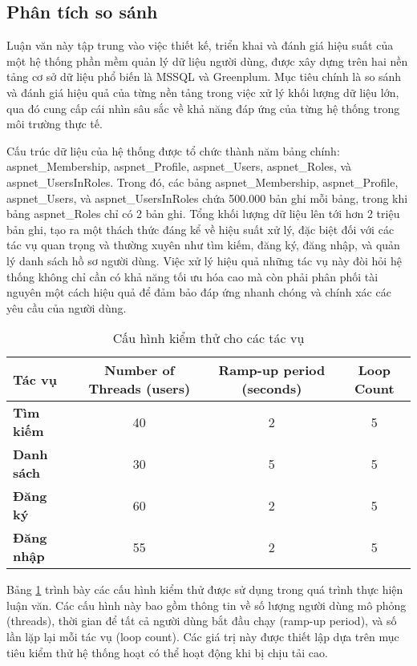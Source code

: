 \subsection{Phân tích so sánh}

Luận văn này tập trung vào việc thiết kế, triển khai và đánh giá hiệu suất của một hệ thống phần mềm quản lý dữ liệu người dùng, được xây dựng trên hai nền tảng cơ sở dữ liệu phổ biến là MSSQL và Greenplum. Mục tiêu chính là so sánh và đánh giá hiệu quả của từng nền tảng trong việc xử lý khối lượng dữ liệu lớn, qua đó cung cấp cái nhìn sâu sắc về khả năng đáp ứng của từng hệ thống trong môi trường thực tế.

Cấu trúc dữ liệu của hệ thống được tổ chức thành năm bảng chính: aspnet\_Membership, aspnet\_Profile, aspnet\_Users, aspnet\_Roles, và aspnet\_UsersInRoles. Trong đó, các bảng aspnet\_Membership, aspnet\_Profile, aspnet\_Users, và aspnet\_UsersInRoles chứa 500.000 bản ghi mỗi bảng, trong khi bảng aspnet\_Roles chỉ có 2 bản ghi. Tổng khối lượng dữ liệu lên tới hơn 2 triệu bản ghi, tạo ra một thách thức đáng kể về hiệu suất xử lý, đặc biệt đối với các tác vụ quan trọng và thường xuyên như tìm kiếm, đăng ký, đăng nhập, và quản lý danh sách hồ sơ người dùng. Việc xử lý hiệu quả những tác vụ này đòi hỏi hệ thống không chỉ cần có khả năng tối ưu hóa cao mà còn phải phân phối tài nguyên một cách hiệu quả để đảm bảo đáp ứng nhanh chóng và chính xác các yêu cầu của người dùng.

\begin{table}[htbp]
\centering
\renewcommand{\arraystretch}{1.3} %
\begin{tabular}{|l|c|c|c|}
\hline
\textbf{Tác vụ} & \textbf{Number of Threads (users)} & \textbf{Ramp-up period (seconds)} & \textbf{Loop Count} \\ \hline
\textbf{Tìm kiếm} & 40 & 2 & 5 \\ \hline
\textbf{Danh sách} & 30 & 5 & 5 \\ \hline
\textbf{Đăng ký} & 60 & 2 & 5 \\ \hline
\textbf{Đăng nhập} & 55 & 2 & 5 \\ \hline
\end{tabular}
\caption{Cấu hình kiểm thử cho các tác vụ}
\label{tab:task_configuration}
\end{table}

Bảng \ref{tab:task_configuration} trình bày các cấu hình kiểm thử được sử dụng trong quá trình thực hiện luận văn. Các cấu hình này bao gồm thông tin về số lượng người dùng mô phỏng (threads), thời gian để tất cả người dùng bắt đầu chạy (ramp-up period), và số lần lặp lại mỗi tác vụ (loop count). Các giá trị này được thiết lập dựa trên mục tiêu kiểm thử hệ thống hoạt có thể hoạt động khi bị chịu tải cao.




